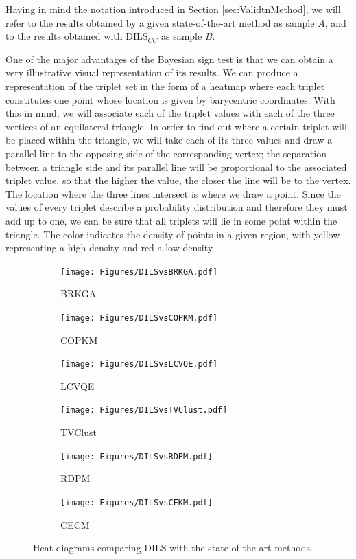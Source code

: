 \documentclass[review]{elsarticle}
\begin{document}
Having in mind the notation introduced in Section \ref{sec:ValidtnMethod}, we will refer to the results obtained by a given state-of-the-art method as sample $A$, and to the results obtained with DILS$_{CC}$ as sample $B$.

One of the major advantages of the Bayesian sign test is that we can obtain a very illustrative visual representation of its results. We can produce a representation of the triplet set in the form of a heatmap where each triplet constitutes one point whose location is given by barycentric coordinates. With this in mind, we will associate each of the triplet values with each of the three vertices of an equilateral triangle. In order to find out where a certain triplet will be placed within the triangle, we will take each of its three values and draw a parallel line to the opposing side of the corresponding vertex; the separation between a triangle side and its parallel line will be proportional to the associated triplet value, so that the higher the value, the closer the line will be to the vertex. The location where the three lines intersect is where we draw a point. Since the values of every triplet describe a probability distribution and therefore they must add up to one, we can be sure that all triplets will lie in some point within the triangle. The color indicates the density of points in a given region, with yellow representing a high density and red a low density.

\begin{figure}[ht!]
	\centering
	\begin{subfigure}{.45\textwidth}
		\texttt{[image: Figures/DILSvsBRKGA.pdf]}
		\caption{BRKGA}
		\label{fig:DILSvsBRKGA}
	\end{subfigure}
	\begin{subfigure}{.45\textwidth}
		\texttt{[image: Figures/DILSvsCOPKM.pdf]}
		\caption{COPKM}
		\label{fig:DILSvsCOPKM}
	\end{subfigure}
	\begin{subfigure}{.45\textwidth}
		\texttt{[image: Figures/DILSvsLCVQE.pdf]}
		\caption{LCVQE}
		\label{fig:DILSvsLCVQE}
	\end{subfigure}
	\begin{subfigure}{.45\textwidth}
		\texttt{[image: Figures/DILSvsTVClust.pdf]}
		\caption{TVClust}
		\label{fig:DILSvsTVClust}
	\end{subfigure}
	\begin{subfigure}{.45\textwidth}
		\texttt{[image: Figures/DILSvsRDPM.pdf]}
		\caption{RDPM}
		\label{fig:DILSvsRDPM}
	\end{subfigure}
	\begin{subfigure}{.45\textwidth}
		\texttt{[image: Figures/DILSvsCEKM.pdf]}
		\caption{CECM}
		\label{fig:DILSvsCECM}
	\end{subfigure}
	\caption{Heat diagrams comparing DILS with the state-of-the-art methods.}
	\label{fig:heatDiag}
\end{figure}
\end{document}
